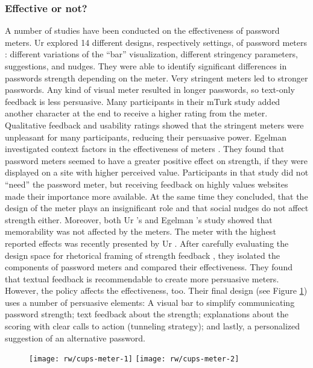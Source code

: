 	\subsubsection{Effective or not?}
	A number of studies have been conducted on the effectiveness of password meters. Ur \etal explored 14 different designs, respectively settings, of password meters \cite{Ur2012HowDoesYourPasswordMeasureUp}: different variations of the ``bar'' visualization, different stringency parameters, suggestions, and nudges. They were able to identify significant differences in passwords strength depending on the meter. Very stringent meters led to stronger passwords. Any kind of visual meter resulted in longer passwords, so text-only feedback is less persuasive. Many participants in their \gls{mTurk} study added another character at the end to receive a higher rating from the meter. Qualitative feedback and usability ratings showed that the stringent meters were unpleasant for many participants, reducing their persuasive power. Egelman \etal investigated context factors in the effectiveness of meters \cite{Egelman2013DoesMyPasswordGoUpToEleven}. They found that password meters seemed to have a greater positive effect on strength, if they were displayed on a site with higher perceived value. Participants in that study did not ``need'' the password meter, but receiving feedback on highly values websites made their importance more available. At the same time they concluded, that the design of the meter plays an insignificant role and that social nudges do not affect strength either. Moreover, both Ur \etal's and Egelman \etal's study showed that memorability was not affected by the meters.
	The meter with the highest reported effects was recently presented by Ur \etal \cite{Ur2017DataDrivenPWMeter}. After carefully evaluating the design space for rhetorical framing of strength feedback \cite{Eargle2015YouCanDoBetter}, they isolated the components of password meters and compared their effectiveness. They found that textual feedback is recommendable to create more persuasive meters. However, the policy affects the effectiveness, too. Their final design (see Figure \ref{fig:rw:cups-meter}) uses a number of persuasive elements: A visual bar to simplify communicating password strength; text feedback about the strength; explanations about the scoring with clear calls to action (tunneling strategy); and lastly, a personalized suggestion of an alternative password. 
		
	\begin{figure}
		\texttt{[image: rw/cups-meter-1]}
		\texttt{[image: rw/cups-meter-2]}
		\caption{\label{fig:rw:cups-meter}}
	\end{figure}
	
